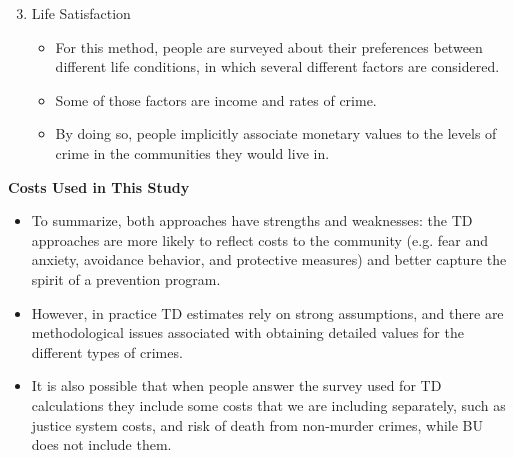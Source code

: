 \documentclass[static]{JJH-Beamer}
\begin{document}
\begin{frame}
 \addtocounter{framenumber}{-1}

\begin{enumerate}
\setcounter{enumi}{2}
\item Life Satisfaction
    \begin{itemize}
    \item For this method, people are surveyed about their preferences between different life conditions, in which several different factors are considered.
    \item Some of those factors are income and rates of crime.
    \item By doing so, people implicitly associate monetary values to the levels of crime in the communities they would live in.
    \end{itemize}
\end{enumerate}

\end{frame}

\begin{frame}
 \addtocounter{framenumber}{-1}

\begin{center}
\textbf{Costs Used in This Study}
\end{center}
\begin{itemize}
\item To summarize, both approaches have strengths and weaknesses: the TD approaches are more likely to reflect costs to the community (e.g. fear and anxiety, avoidance behavior, and protective measures) and better capture the spirit of a prevention program.
\item However, in practice TD estimates rely on strong assumptions, and there are methodological issues associated with obtaining detailed values for the different types of crimes.
\item It is also possible that when people answer the survey used for TD calculations they include some costs that we are including separately, such as justice system costs, and risk of death from non-murder crimes, while BU does not include them.
\end{itemize}

\end{frame}
\end{document}
